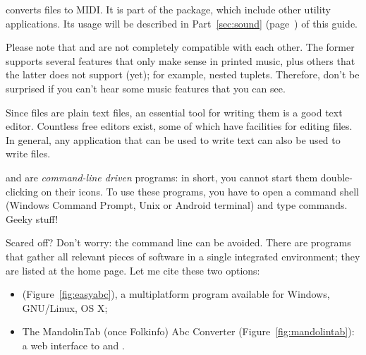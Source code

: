 \documentclass[a4paper,12pt]{book}
\begin{document}
\abcmid{} converts \ABC{} files to MIDI. It is part of the \abcMID{}
package, which include other utility applications. Its usage will be
described in Part~\ref{sec:sound} (page~\pageref{sec:sound}) of this
guide.

\begin{warn}

  Please note that \abcm{} and \abcMID{} are not completely compatible
  with each other. The former supports several \ABC{} features that
  only make sense in printed music, plus others that the latter does
  not support (yet); for example, nested tuplets. Therefore, don't be
  surprised if you can't hear some music features that you can see.

\end{warn}

Since \ABC{} files are plain text files, an essential tool for writing
them is a good text editor. Countless free editors exist, some of
which have facilities for editing \ABC{} files. In general, any
application that can be used to write text can also be used to write
\ABC{} files.




\abcm{} and \abcmid{} are \emph{command-line driven} programs: in
short, you cannot start them double-clicking on their icons. To use
these programs, you have to open a command shell (Windows Command
Prompt, Unix or Android terminal) and type commands. Geeky stuff!

Scared off? Don't worry: the command line can be avoided. There are
programs that gather all relevant pieces of software in a single
integrated environment; they are listed at the \ABCPLUS{} home page.
Let me cite these two options:

\begin{itemize}

  \item \easyabc{} (Figure~\ref{fig:easyabc}), a multiplatform program
  available for Windows, GNU/Linux, OS X;
  
  \item The MandolinTab (once Folkinfo) Abc Converter
  (Figure~\ref{fig:mandolintab}): a web interface to \abcm{} and \abcMID.
  
\end{itemize}
\end{document}
